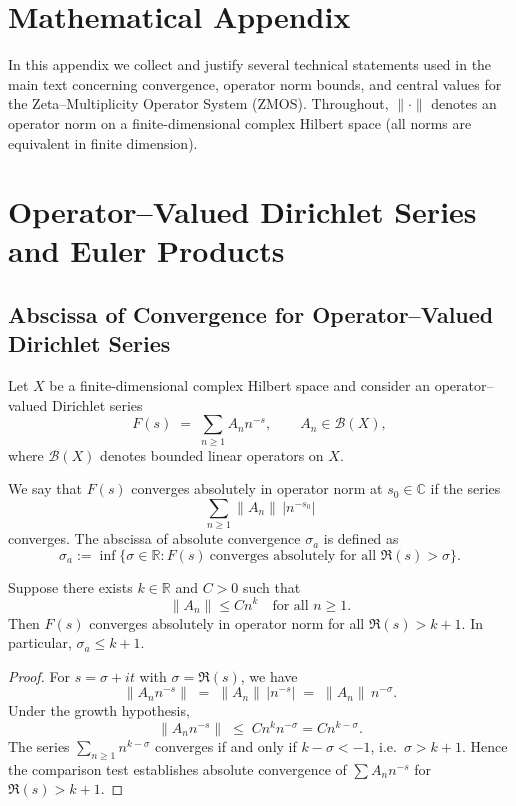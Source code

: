 \documentclass[11pt]{article}
\begin{document}
\appendix
\section*{Mathematical Appendix}

In this appendix we collect and justify several technical statements
used in the main text concerning convergence, operator norm bounds, and
central values for the Zeta–Multiplicity Operator System (ZMOS).
Throughout, $\|\cdot\|$ denotes an operator norm on a finite-dimensional
complex Hilbert space (all norms are equivalent in finite dimension).

\section{Operator–Valued Dirichlet Series and Euler Products}

\subsection{Abscissa of Convergence for Operator–Valued Dirichlet Series}

Let $X$ be a finite-dimensional complex Hilbert space and consider an
operator–valued Dirichlet series
\[
  F(s) \;=\; \sum_{n \ge 1} A_n n^{-s}, \qquad A_n \in \mathcal{B}(X),
\]
where $\mathcal{B}(X)$ denotes bounded linear operators on $X$.

\begin{definition}
We say that $F(s)$ converges absolutely in operator norm at $s_0 \in \mathbb{C}$
if the series
\[
  \sum_{n \ge 1} \|A_n\|\, |n^{-s_0}|
\]
converges. The abscissa of absolute convergence $\sigma_a$ is defined as
\[
  \sigma_a := \inf\{\sigma \in \mathbb{R} : F(s)\ \text{converges absolutely for all } \Re(s) > \sigma\}.
\]
\end{definition}

\begin{proposition}
\label{prop:operator_convergence}
Suppose there exists $k \in \mathbb{R}$ and $C>0$ such that
\[
  \|A_n\| \le C n^k \quad \text{for all } n \ge 1.
\]
Then $F(s)$ converges absolutely in operator norm for all $\Re(s)>k+1$.
In particular, $\sigma_a \le k+1$.
\end{proposition}

\begin{proof}
For $s = \sigma + it$ with $\sigma = \Re(s)$, we have
\[
  \|A_n n^{-s}\| \;=\; \|A_n\|\, |n^{-s}|
  \;=\; \|A_n\|\, n^{-\sigma}.
\]
Under the growth hypothesis,
\[
  \|A_n n^{-s}\|
  \;\le\; C n^k n^{-\sigma} = C n^{k - \sigma}.
\]
The series $\sum_{n\ge 1} n^{k - \sigma}$ converges if and only if
$k - \sigma < -1$, i.e.\ $\sigma > k+1$. Hence the comparison test
establishes absolute convergence of $\sum A_n n^{-s}$ for $\Re(s) > k+1$.
\end{proof}
\end{document}
